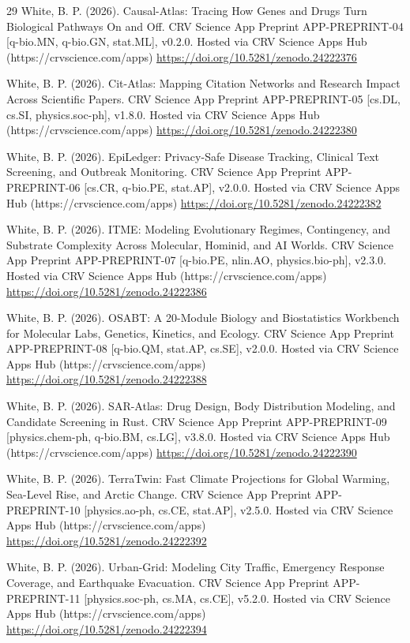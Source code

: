 \documentclass[10pt,letterpaper]{article}
\begin{document}
\begin{thebibliography}{29}
 White, B. P. (2026). Causal-Atlas: Tracing How Genes and Drugs Turn Biological Pathways On and Off. CRV Science App Preprint APP-PREPRINT-04 [q-bio.MN, q-bio.GN, stat.ML], v0.2.0. Hosted via CRV Science Apps Hub (https://crvscience.com/apps) \url{https://doi.org/10.5281/zenodo.24222376}

 White, B. P. (2026). Cit-Atlas: Mapping Citation Networks and Research Impact Across Scientific Papers. CRV Science App Preprint APP-PREPRINT-05 [cs.DL, cs.SI, physics.soc-ph], v1.8.0. Hosted via CRV Science Apps Hub (https://crvscience.com/apps) \url{https://doi.org/10.5281/zenodo.24222380}

 White, B. P. (2026). EpiLedger: Privacy-Safe Disease Tracking, Clinical Text Screening, and Outbreak Monitoring. CRV Science App Preprint APP-PREPRINT-06 [cs.CR, q-bio.PE, stat.AP], v2.0.0. Hosted via CRV Science Apps Hub (https://crvscience.com/apps) \url{https://doi.org/10.5281/zenodo.24222382}

 White, B. P. (2026). ITME: Modeling Evolutionary Regimes, Contingency, and Substrate Complexity Across Molecular, Hominid, and AI Worlds. CRV Science App Preprint APP-PREPRINT-07 [q-bio.PE, nlin.AO, physics.bio-ph], v2.3.0. Hosted via CRV Science Apps Hub (https://crvscience.com/apps) \url{https://doi.org/10.5281/zenodo.24222386}

 White, B. P. (2026). OSABT: A 20-Module Biology and Biostatistics Workbench for Molecular Labs, Genetics, Kinetics, and Ecology. CRV Science App Preprint APP-PREPRINT-08 [q-bio.QM, stat.AP, cs.SE], v2.0.0. Hosted via CRV Science Apps Hub (https://crvscience.com/apps) \url{https://doi.org/10.5281/zenodo.24222388}

 White, B. P. (2026). SAR-Atlas: Drug Design, Body Distribution Modeling, and Candidate Screening in Rust. CRV Science App Preprint APP-PREPRINT-09 [physics.chem-ph, q-bio.BM, cs.LG], v3.8.0. Hosted via CRV Science Apps Hub (https://crvscience.com/apps) \url{https://doi.org/10.5281/zenodo.24222390}

 White, B. P. (2026). TerraTwin: Fast Climate Projections for Global Warming, Sea-Level Rise, and Arctic Change. CRV Science App Preprint APP-PREPRINT-10 [physics.ao-ph, cs.CE, stat.AP], v2.5.0. Hosted via CRV Science Apps Hub (https://crvscience.com/apps) \url{https://doi.org/10.5281/zenodo.24222392}

 White, B. P. (2026). Urban-Grid: Modeling City Traffic, Emergency Response Coverage, and Earthquake Evacuation. CRV Science App Preprint APP-PREPRINT-11 [physics.soc-ph, cs.MA, cs.CE], v5.2.0. Hosted via CRV Science Apps Hub (https://crvscience.com/apps) \url{https://doi.org/10.5281/zenodo.24222394}


\end{thebibliography}
\end{document}
